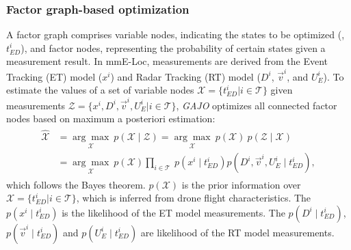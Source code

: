 \subsubsection{\textbf{Factor graph-based optimization}}\label{4.2.1}

A factor graph comprises variable nodes, indicating the states to be optimized (\eg, $t_{ED}^i$), and factor nodes, representing the probability of certain states given a measurement result. 
In mmE-Loc, measurements are derived from the Event Tracking (ET) model ($x^i$) and Radar Tracking (RT) model ($D^i$, $\vec{v}^i$, and $U_E^{i}$).
To estimate the values of a set of variable nodes $\boldsymbol{\mathcal{X}} = \{t_{ED}^i | i \in \mathcal{T}\}$ given measurements $\boldsymbol{\mathcal{Z}} = \{x^i, D^i, \vec{v}^i, U_E^{i} | i \in \mathcal{T}\}$, \textit{GAJO} optimizes all connected factor nodes based on maximum a posteriori estimation:
\begin{align}
\begin{split}
\hat{\boldsymbol{\mathcal{X}}} & =\underset{\boldsymbol{\mathcal{X}}}{\arg \max } \ p(\boldsymbol{\mathcal{X}} \mid \boldsymbol{\mathcal{Z}}) = \underset{\boldsymbol{\mathcal{X}}} {\arg \max } \  p(\boldsymbol{\mathcal{X}}) \ p(\boldsymbol{\mathcal{Z}} \mid \boldsymbol{\mathcal{X}}) \\
& =\underset{\boldsymbol{\mathcal{X}}}{\arg \max } \ 
p(\boldsymbol{\mathcal{X}}) \prod_{i \in \mathcal{T}} \ p\left(x^i \mid t_{ED}^i\right) p\left(D^i, \vec{v}^i, U_E^{i} \mid t_{ED}^i\right),
\end{split}
\label{factor_graph}
\end{align}
which follows the Bayes theorem.
$p(\boldsymbol{\mathcal{X}})$ is the prior information over $\boldsymbol{\mathcal{X}} = \{t_{ED}^i | i \in \mathcal{T}\}$, which is inferred from drone flight characteristics.
The $p\left(x^i \mid t_{ED}^i\right)$ is the likelihood of the ET model measurements. The $p\left(D^i \mid t_{ED}^i\right)$, $p\left(\vec{v}^i \mid t_{ED}^i\right)$ and $p\left(U_E^{i} \mid t_{ED}^i\right)$ are likelihood of the RT model measurements.

